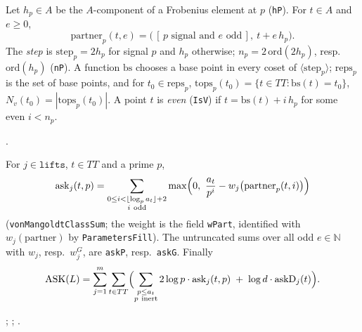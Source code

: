 \begin{definition}\label{def:G-partner}
Let $h_p\in A$ be the $A$-component of a Frobenius element at $p$ (\texttt{hP}). For $t\in A$ and $e\ge 0$,
\[
  \mathrm{partner}_p(t,e)=\bigl(\,[\,p\text{ signal and } e\text{ odd}\,],\ t+e\,h_p\bigr).
\]
The \emph{step} is $\mathrm{step}_p=2h_p$ for signal $p$ and $h_p$ otherwise; $n_p=2\,\mathrm{ord}(2h_p)$,
resp.\ $\mathrm{ord}(h_p)$ (\texttt{nP}). A function $\mathrm{bs}$ chooses a base point in every coset of
$\langle \mathrm{step}_p\rangle$; $\mathrm{reps}_p$ is the set of base points, and for $t_0\in\mathrm{reps}_p$,
$\mathrm{tops}_p(t_0)=\{t\in TT:\mathrm{bs}(t)=t_0\}$, $N_v(t_0)=|\mathrm{tops}_p(t_0)|$. A point $t$ is
\emph{even} (\texttt{IsV}) if $t=\mathrm{bs}(t)+i\,h_p$ for some even $i<n_p$.
\par{\small {}.}\par
\end{definition}

\begin{definition}\label{def:G-ask}
For $j\in\texttt{lifts}$, $t\in TT$ and a prime $p$,
\[
  \mathrm{ask}_j(t,p)=\sum_{\substack{0\le i<\lfloor\log_p a_t\rfloor+2\\ i\ \mathrm{odd}}}
  \max\Bigl(0,\ \frac{a_t}{p^{i}}-w_j\bigl(\mathrm{partner}_p(t,i)\bigr)\Bigr)
\]
(\texttt{vonMangoldtClassSum}; the weight is the field \texttt{wPart}, identified with $w_j(\mathrm{partner})$
by \texttt{ParametersFill}). The untruncated sums over all odd $e\in\mathbb N$ with $w_j$, resp.\ $w_j^G$, are
\texttt{askP}, resp.\ \texttt{askG}. Finally
\[
  \mathrm{ASK}(L)=\sum_{j=1}^{m}\sum_{t\in TT}\Bigl(\sum_{\substack{p\le a_t\\ p\ \mathrm{inert}}}
  2\log p\cdot \mathrm{ask}_j(t,p)\;+\;\log d\cdot\mathrm{askD}_j(t)\Bigr).
\]
\par{\small {}; ; .}\par
\end{definition}

